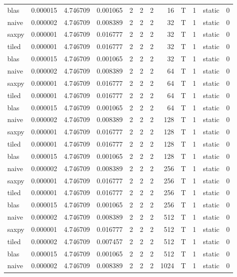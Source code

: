 \documentclass[
  12pt,
  xcolor = usenames,dvipsnames]{article}
\begin{document}
\begin{table}[!h]
{\begin{tabular}[t]{lrrrrrrrlrlr}
blas & 0.000015 & 4.746709 & 0.001065 & 2 & 2 & 2 & 16 & T & 1 & static & 0\\
\addlinespace
naive & 0.000002 & 4.746709 & 0.008389 & 2 & 2 & 2 & 32 & T & 1 & static & 0\\
saxpy & 0.000001 & 4.746709 & 0.016777 & 2 & 2 & 2 & 32 & T & 1 & static & 0\\
tiled & 0.000001 & 4.746709 & 0.016777 & 2 & 2 & 2 & 32 & T & 1 & static & 0\\
blas & 0.000015 & 4.746709 & 0.001065 & 2 & 2 & 2 & 32 & T & 1 & static & 0\\
naive & 0.000002 & 4.746709 & 0.008389 & 2 & 2 & 2 & 64 & T & 1 & static & 0\\
\addlinespace
saxpy & 0.000001 & 4.746709 & 0.016777 & 2 & 2 & 2 & 64 & T & 1 & static & 0\\
tiled & 0.000001 & 4.746709 & 0.016777 & 2 & 2 & 2 & 64 & T & 1 & static & 0\\
blas & 0.000015 & 4.746709 & 0.001065 & 2 & 2 & 2 & 64 & T & 1 & static & 0\\
naive & 0.000002 & 4.746709 & 0.008389 & 2 & 2 & 2 & 128 & T & 1 & static & 0\\
saxpy & 0.000001 & 4.746709 & 0.016777 & 2 & 2 & 2 & 128 & T & 1 & static & 0\\
\addlinespace
tiled & 0.000001 & 4.746709 & 0.016777 & 2 & 2 & 2 & 128 & T & 1 & static & 0\\
blas & 0.000015 & 4.746709 & 0.001065 & 2 & 2 & 2 & 128 & T & 1 & static & 0\\
naive & 0.000002 & 4.746709 & 0.008389 & 2 & 2 & 2 & 256 & T & 1 & static & 0\\
saxpy & 0.000001 & 4.746709 & 0.016777 & 2 & 2 & 2 & 256 & T & 1 & static & 0\\
tiled & 0.000001 & 4.746709 & 0.016777 & 2 & 2 & 2 & 256 & T & 1 & static & 0\\
\addlinespace
blas & 0.000015 & 4.746709 & 0.001065 & 2 & 2 & 2 & 256 & T & 1 & static & 0\\
naive & 0.000002 & 4.746709 & 0.008389 & 2 & 2 & 2 & 512 & T & 1 & static & 0\\
saxpy & 0.000001 & 4.746709 & 0.016777 & 2 & 2 & 2 & 512 & T & 1 & static & 0\\
tiled & 0.000002 & 4.746709 & 0.007457 & 2 & 2 & 2 & 512 & T & 1 & static & 0\\
blas & 0.000015 & 4.746709 & 0.001065 & 2 & 2 & 2 & 512 & T & 1 & static & 0\\
\addlinespace
naive & 0.000002 & 4.746709 & 0.008389 & 2 & 2 & 2 & 1024 & T & 1 & static & 0\\

\end{tabular}}
\end{table}
\end{document}
